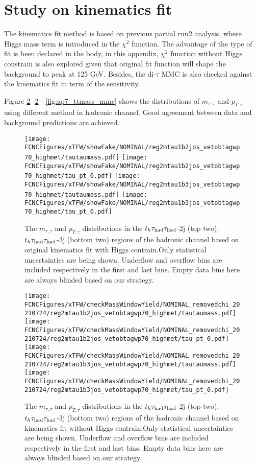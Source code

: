 \section{Study on kinematics fit}
\label{sec:kine}

The kinematics fit method is based on previous partial run2 analysis, where Higgs mass term is introduced in the $\chi^2$ function. 
The advantage of the type of fit is been declared in the body, in this appendix, $\chi^2$ function without Higgs constrain is also explored given that original fit function
will shape the background to peak at 125 GeV. Besides, the di-$\tau$ MMC is also checked against the kinematics fit in term of the sensitivity.

Figure \ref{fig:ap7_ttmass_removedchi2} -\ref{fig:ap7_ttmass_removedchi2} - \ref{fig:ap7_ttmass_mmc} shows the distributions of $m_{\tau,\tau}$ and $p_{T,\tau}$ using different method in hadronic channel. Good agreement between data and background predictions are achieved.


\begin{figure}[H]
\centering
\texttt{[image: \\FCNCFigures/xTFW/showFake/NOMINAL/reg2mtau1b2jos\_vetobtagwp70\_highmet/tautaumass.pdf]}
\texttt{[image: \\FCNCFigures/xTFW/showFake/NOMINAL/reg2mtau1b2jos\_vetobtagwp70\_highmet/tau\_pt\_0.pdf]}
\texttt{[image: \\FCNCFigures/xTFW/showFake/NOMINAL/reg2mtau1b3jos\_vetobtagwp70\_highmet/tautaumass.pdf]}
\texttt{[image: \\FCNCFigures/xTFW/showFake/NOMINAL/reg2mtau1b3jos\_vetobtagwp70\_highmet/tau\_pt\_0.pdf]}
\caption{ The $m_{\tau,\tau}$ and $p_{T,\tau}$ distributions in the $t_h\tau_\text{had}{}\tau_\text{had}$-2j (top two), $t_h\tau_\text{had}{}\tau_\text{had}$-3j (bottom two) regions of the hadronic channel based on original kinematics fit with Higgs contrain.Only statistical uncertainties are being shown. Underflow and overflow bins are included respectively in the first and last bins. Empty data bins here are always blinded based on our strategy.}
\label{fig:ap7_ttmass_originalchi2}
\end{figure}


\begin{figure}[H]
\centering
\texttt{[image: \\FCNCFigures/xTFW/checkMassWindowYield/NOMINAL\_removedchi\_20210724/reg2mtau1b2jos\_vetobtagwp70\_highmet/tautaumass.pdf]}
\texttt{[image: \\FCNCFigures/xTFW/checkMassWindowYield/NOMINAL\_removedchi\_20210724/reg2mtau1b2jos\_vetobtagwp70\_highmet/tau\_pt\_0.pdf]}
\texttt{[image: \\FCNCFigures/xTFW/checkMassWindowYield/NOMINAL\_removedchi\_20210724/reg2mtau1b3jos\_vetobtagwp70\_highmet/tautaumass.pdf]}
\texttt{[image: \\FCNCFigures/xTFW/checkMassWindowYield/NOMINAL\_removedchi\_20210724/reg2mtau1b3jos\_vetobtagwp70\_highmet/tau\_pt\_0.pdf]}
\caption{ The $m_{\tau,\tau}$ and $p_{T,\tau}$ distributions in the $t_h\tau_\text{had}{}\tau_\text{had}$-2j (top two), $t_h\tau_\text{had}{}\tau_\text{had}$-3j (bottom two) regions of the hadronic channel based on kinematics fit without Higgs contrain.Only statistical uncertainties are being shown. Underflow and overflow bins are included respectively in the first and last bins. Empty data bins here are always blinded based on our strategy.}
\label{fig:ap7_ttmass_removedchi2}
\end{figure}

